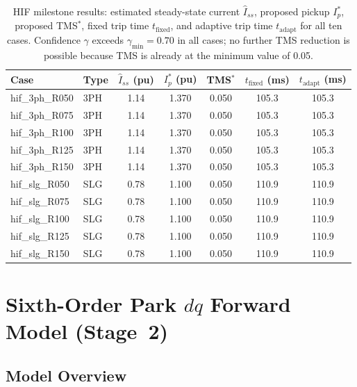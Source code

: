\documentclass[12pt,a4paper]{article}
\theoremstyle{definition}
\theoremstyle{plain}
\begin{document}
\begin{table}[htbp]
  \centering
  \caption{HIF milestone results: estimated steady-state current
           $\hat{I}_{ss}$, proposed pickup $I_p^*$, proposed TMS$^*$,
           fixed trip time $t_{\mathrm{fixed}}$, and adaptive trip time
           $t_{\mathrm{adapt}}$ for all ten cases.
           Confidence $\gamma$ exceeds $\gamma_{\min}=0.70$ in all cases;
           no further TMS reduction is possible because TMS is already
           at the minimum value of 0.05.}
  \label{tab:hif:results}
  \small
  \begin{tabular}{llccccc}
    \toprule
    Case & Type & $\hat{I}_{ss}$ (pu) & $I_p^*$ (pu) & TMS$^*$ &
    $t_{\mathrm{fixed}}$ (ms) & $t_{\mathrm{adapt}}$ (ms) \\
    \midrule
    hif\_3ph\_R050 & 3PH & 1.14 & 1.370 & 0.050 & 105.3 & 105.3 \\
    hif\_3ph\_R075 & 3PH & 1.14 & 1.370 & 0.050 & 105.3 & 105.3 \\
    hif\_3ph\_R100 & 3PH & 1.14 & 1.370 & 0.050 & 105.3 & 105.3 \\
    hif\_3ph\_R125 & 3PH & 1.14 & 1.370 & 0.050 & 105.3 & 105.3 \\
    hif\_3ph\_R150 & 3PH & 1.14 & 1.370 & 0.050 & 105.3 & 105.3 \\
    hif\_slg\_R050 & SLG & 0.78 & 1.100 & 0.050 & 110.9 & 110.9 \\
    hif\_slg\_R075 & SLG & 0.78 & 1.100 & 0.050 & 110.9 & 110.9 \\
    hif\_slg\_R100 & SLG & 0.78 & 1.100 & 0.050 & 110.9 & 110.9 \\
    hif\_slg\_R125 & SLG & 0.78 & 1.100 & 0.050 & 110.9 & 110.9 \\
    hif\_slg\_R150 & SLG & 0.78 & 1.100 & 0.050 & 110.9 & 110.9 \\
    \bottomrule
  \end{tabular}
\end{table}

\section{Sixth-Order Park \texorpdfstring{$dq$}{dq} Forward Model (Stage~2)}
\label{sec:parkdq}

\subsection{Model Overview}
\label{sec:parkdq:overview}
\end{document}
